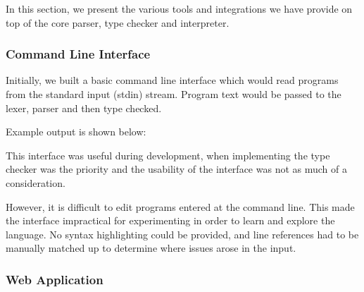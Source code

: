 \documentclass[a4paper,openany,12pt]{book}
\begin{document}
In this section, we present the various tools and integrations we have provide on top of the core parser, type checker
and interpreter.

\subsubsection{Command Line Interface}

Initially, we built a basic command line interface which would read programs from the standard input (stdin) stream.
Program text would be passed to the lexer, parser and then type checked.

Example output is shown below:


This interface was useful during development, when implementing the type checker was the priority and the usability
of the interface was not as much of a consideration.

However, it is difficult to edit programs entered at the command line.
This made the interface impractical for experimenting in order to learn and explore the language.
No syntax highlighting could be provided, and line references had to be manually matched up to determine where
issues arose in the input.

\subsubsection{Web Application}
\end{document}
